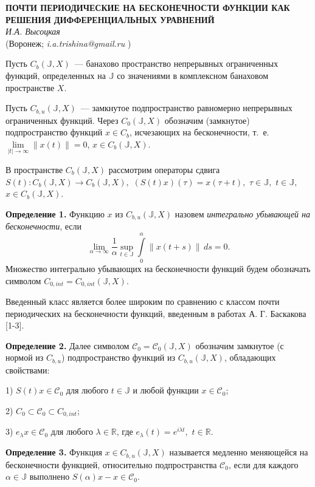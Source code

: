 \begin{center}{ \bf ПОЧТИ ПЕРИОДИЧЕСКИЕ НА БЕСКОНЕЧНОСТИ ФУНКЦИИ КАК РЕШЕНИЯ ДИФФЕРЕНЦИАЛЬНЫХ УРАВНЕНИЙ}\\
{\it И.А. Высоцкая } \\
(Воронеж; {\it i.a.trishina@gmail.ru} )
\end{center}

Пусть $C_b(\mathbb{J},X)$~--- банахово пространство непрерывных ограниченных функций,
определенных на $\mathbb{J}$ со значениями в комплексном банаховом пространстве $X$.

Пусть $C_{b,u}(\mathbb{J},X)$~--- замкнутое подпространство равномерно непрерывных ограниченных функций. Через $C_0(\mathbb{J},X)$ обозначим (замкнутое) подпространство функций $x\in C_b$,
 исчезающих на бесконечности, т.~е. $\lim\limits_{|t|\rightarrow\infty}\|x(t)\|=0$, $x\in C_b(\mathbb{J},X)$.

В пространстве $C_{b}(\mathbb{J},X)$ рассмотрим операторы сдвига $S(t):C_{b}(\mathbb{J},X)\rightarrow C_{b}(\mathbb{J},X),$ $(S(t)x)(\tau) = x(\tau + t),$ $\tau\in\mathbb{J},$ $t\in\mathbb{J},$ $x\in C_{b}(\mathbb{J},X)$.


\textbf{Определение 1.} Функцию  $x$ из $C_{b,u}(\mathbb{J},X)$ назовем \emph{интегрально убывающей на бесконечности},
если $$\lim\limits_{\alpha\rightarrow\infty}\frac{1}{\alpha}\sup\limits_{t\in\mathbb{J}}\int\limits_0^{\alpha}\|x(t+s)\|\,ds=0.$$
Множество интегрально убывающих на бесконечности фун\-к\-ций будем обозначать символом $C_{0,int}=C_{0,int}(\mathbb{J},X)$.

Введенный класс является более широким по сравнению с
классом почти периодических на бесконечности функций, введенным в работах А. Г.
Баскакова [1-3].

\textbf{Определение 2.} Далее символом $\mathcal{C}_0=\mathcal{C}_0(\mathbb{J},X)$ обозначим замкнутое (с нормой из $C_{b,u}$) подпространство функций из $C_{b,u}(\mathbb{J},X)$, обладающих свойствами:

1) $S(t)x\in \mathcal{C}_0$ для любого $t\in\mathbb{J}$ и любой функции $x\in\mathcal{C}_0$;

2) $C_0 \subset \mathcal{C}_0 \subset C_{0,int}$;

3) $e_{\lambda}x \in \mathcal{C}_0$ для любого $\lambda\in\mathbb{R}$, где $e_{\lambda}(t)=e^{i\lambda t},$ $t\in\mathbb{R}$.


\textbf{Определение 3.}
Функция $x\in C_{b,u}(\mathbb{J},X)$ называется медленно
меняющейся на бесконечности функцией, относительно подпространства $\mathcal{C}_0$, если для каждого $\alpha \in \mathbb{J}$ выполнено $S(\alpha)x-x\in \mathcal{C}_{0}$.



